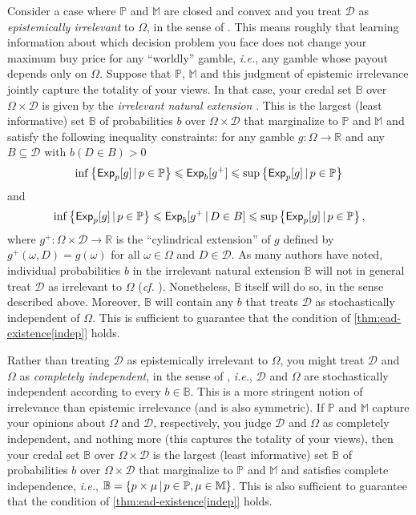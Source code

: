 \documentclass[a4paper]{article}
\renewcommand\P{\mathbb{P}} %
\newcommand\Exp{\mathsf{Exp}}
\newcommand{\D}{\mathcal{D}}
\newcommand{\IB}{\mathbb{B}}
\newcommand{\ID}{\mathbb{M}}
\newcommand{\IP}{\P}
\newcommand\SetDelimiter[1][]{
	\nonscript\,#1\vert \allowbreak \nonscript\,\mathopen{}}
\providecommand\given{\SetDelimiter}
\renewcommand{\leq}{\leqslant}
\newenvironment{CCM rewritten}
{\begingroup\color{blue}} %
{\endgroup}              %
\begin{document}
Consider a case where $\IP$ and $\ID$ are closed and convex and you treat $\D$ as \emph{epistemically irrelevant} to $\Omega$, in the sense of \cite{walley1991srip}. This means roughly that learning information about which decision problem you face does not change your maximum buy price for any ``worldly'' gamble, \emph{i.e.}, any gamble whose payout depends only on $\Omega$. Suppose that $\IP$, $\ID$ and this judgment of epistemic irrelevance jointly capture the totality of your views. In that case, your credal set $\IB$ over $\Omega \times \D$ is given by the \emph{irrelevant natural extension}  \citep[see][Thm 13]{cooman2012}. %
This is the largest (least informative) set $\IB$ of probabilities $b$ over $\Omega \times \D$ that marginalize to $\IP$ and $\ID$ and satisfy the following inequality constraints: for any gamble $g:\Omega\rightarrow\mathbb{R}$ and any $B\subseteq\D$ with $b(D\in B)>0$
\[
\inf\left\{\Exp_p[g]\given p\in\IP\right\}\leq\Exp_b[g^+]\leq\sup\left\{\Exp_p[g]\given p\in\IP\right\}
\]
and
\[
\inf\left\{\Exp_p[g]\given p\in\IP\right\}\leq\Exp_b[g^+\given D\in B]\leq\sup\left\{\Exp_p[g]\given p\in\IP\right\},
\]
where $g^+:\Omega\times\D\rightarrow\mathbb{R}$ is the ``cylindrical extension'' of $g$ defined by $g^+(\omega,D)=g(\omega)$ for all $\omega\in\Omega$ and $D\in\D$. As many authors have noted, individual probabilities $b$ in the irrelevant natural extension $\IB$ will not in general treat $\D$ as irrelevant to $\Omega$ (\emph{cf.} \cite[pp. 96-7]{debock2019iar}). Nonetheless, $\IB$ itself will do so, in the sense described above. Moreover, $\IB$ will contain any $b$ that treats $\D$ as stochastically independent of $\Omega$. This is sufficient to guarantee that the condition of \cref{thm:ead-existence[indep]} holds.

Rather than treating $\D$ as epistemically irrelevant to $\Omega$, you might treat $\D$ and $\Omega$ as \emph{completely independent}, in the sense of \cite{seidenfeld2007ci,cozman2012}, \emph{i.e.}, $\D$ and $\Omega$ are stochastically independent according to every $b\in\IB$. This is a more stringent notion of irrelevance than epistemic irrelevance (and is also symmetric). If $\IP$ and $\ID$ capture your opinions about $\Omega$ and $\D$, respectively, you judge $\D$ and $\Omega$ as completely independent, and nothing more (this captures the totality of your views), then your credal set $\IB$ over $\Omega \times \D$ is the largest (least informative) set $\IB$ of probabilities $b$ over $\Omega \times \D$ that marginalize to $\IP$ and $\ID$ and satisfies complete independence, \emph{i.e.}, $\IB=\left\{p\times\mu\given p\in\IP, \mu\in\ID\right\}$. This is also sufficient to guarantee that the condition of \cref{thm:ead-existence[indep]} holds.
\end{document}
